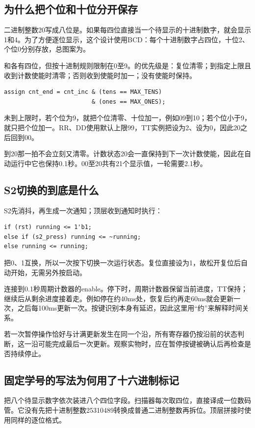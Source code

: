 \subsection{为什么把个位和十位分开保存}
二进制整数20写成八位是。如果每四位直接当一个待显示的十进制数字，就会显示1和4。为了方便逐位显示，这个设计使用BCD：每个十进制数字占四位，十位2、个位0分别存放，总图案为。

和各有四位，但按十进制规则限制在0至9。的优先级是：复位清零；到指定上限且收到计数使能时清零；否则收到使能时加一；没有使能时保持。
\begin{lstlisting}
assign cnt_end = cnt_inc & (tens == MAX_TENS)
                         & (ones == MAX_ONES);
\end{lstlisting}
未到上限时，若个位为9，就把个位清零、十位加一，例如09到10；若个位小于9，就只把个位加一。RR、DD使用默认上限99，TT实例把设为2、设为0，因此20之后回到00。

到20那一拍不会立刻又清零。计数状态20会一直保持到下一次计数使能，因此在自动运行中它也保持0.1秒。00至20共有21个显示值，一轮需要2.1秒。

\subsection{S2切换的到底是什么}
S2先消抖，再生成一次通知；顶层收到通知时执行：
\begin{lstlisting}
if (rst) running <= 1'b1;
else if (s2_press) running <= ~running;
else running <= running;
\end{lstlisting}
把0、1互换，所以一次按下切换一次运行状态。复位直接设为1，故松开复位后自动开始，无需另外按启动。

连接到0.1秒周期计数器的enable。停下时，周期计数器保留当前进度，TT保持；继续后从剩余进度接着走。例如停在约40ms处，恢复后约再走60ms就会更新一次，之后每100ms更新一次。按键识别本身有延迟，因此这里用“约”来解释时间关系。

若一次暂停操作恰好与计满更新发生在同一个沿，所有寄存器仍按沿前的状态判断，这一沿可能完成最后一次更新。观察实物时，应在暂停按键被确认后再检查是否持续停止。

\subsection{固定学号的写法为何用了十六进制标记}
把八个待显示数字依次装进八个四位字段。扫描器每次取四位，直接译成一位数码管。它没有先把十进制整数25310489转换成普通二进制整数再拆位。顶层拼接时使用同样的逐位格式。

